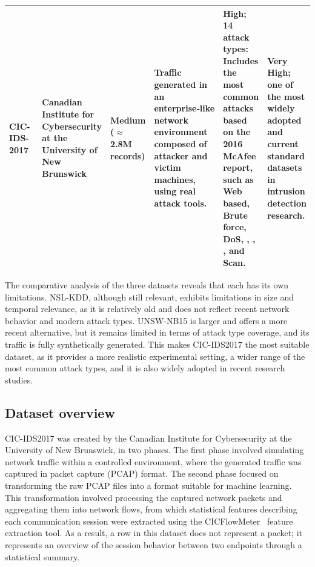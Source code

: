 \begin{table}[H]
\begin{tabulary}{\textwidth}{|p{1.5cm}|p{2.5cm}|p{1.4cm}|L|L|L|}
        CIC-IDS-2017~\cite{sharafaldin2018toward}                                                                                  &
        Canadian Institute for Cybersecurity at the University of New Brunswick                                                           &
        Medium ($\approx$2.8M records)                                                                    &
        Traffic generated in an enterprise‑like network environment composed of attacker and victim machines, using real attack tools.                          &
        High; 14 attack types: Includes the most common attacks based on the 2016 McAfee report, such as Web based, Brute force, DoS, , , ,  and Scan.                     &
        Very High; one of the most widely adopted and current standard datasets in intrusion detection research.                                                                                                                                                                                                         \\
        \hline
    \end{tabulary}
\end{table}
\vspace{2cm}
The comparative analysis of the three datasets reveals that each has its own limitations. NSL-KDD, although still relevant, exhibits limitations in size and temporal relevance, as it is relatively old and does not reflect recent network behavior and modern attack types. UNSW-NB15 is larger and offers a more recent alternative, but it remains limited in terms of attack type coverage, and its traffic is fully synthetically generated. This makes CIC-IDS2017 the most suitable dataset, as it provides a more realistic experimental setting, a wider range of the most common attack types, and it is also widely adopted in recent research studies.

\subsection{Dataset overview}

CIC-IDS2017 was created by the Canadian Institute for Cybersecurity at the University of New Brunswick, in two phases.
The first phase involved simulating network traffic within a controlled environment, where the generated traffic was captured in packet capture (PCAP) format.
The second phase focused on transforming the raw PCAP files into a format suitable for machine learning. This transformation involved processing the captured network packets and aggregating them into network flows, from which statistical features describing each communication session were extracted using the CICFlowMeter~\cite{CICFlowMeter} feature extraction tool.
As a result, a row in this dataset does not represent a packet; it represents an overview of the session behavior between two endpoints through a statistical summary.

